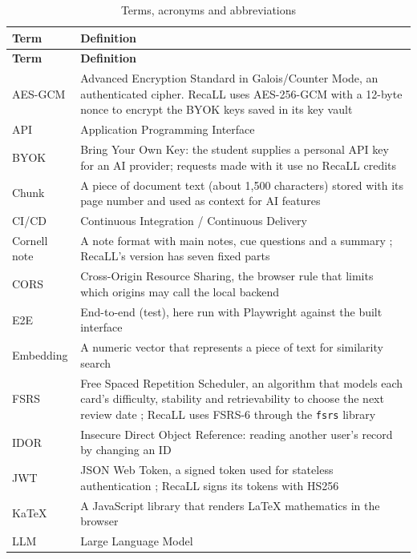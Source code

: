 \begin{small}
\begin{longtable}{@{}>{\raggedright\arraybackslash}p{3.0cm} >{\raggedright\arraybackslash}p{}@{}}
\caption{Terms, acronyms and abbreviations}\label{tab:terms}\\
\toprule
\textbf{Term} & \textbf{Definition}\\
\midrule
\endfirsthead
\toprule
\textbf{Term} & \textbf{Definition}\\
\midrule
\endhead
\bottomrule
\endfoot
AES-GCM & Advanced Encryption Standard in Galois/Counter Mode, an authenticated cipher. RecaLL
uses AES-256-GCM with a 12-byte nonce to encrypt the BYOK keys saved in its key vault \cite{nist80038d}\\
API & Application Programming Interface\\
BYOK & Bring Your Own Key: the student supplies a personal API key for an AI provider;
requests made with it use no RecaLL credits\\
Chunk & A piece of document text (about 1{,}500 characters) stored with its page number and
used as context for AI features\\
CI/CD & Continuous Integration / Continuous Delivery\\
Cornell note & A note format with main notes, cue questions and a summary \cite{pauk2011};
RecaLL's version has seven fixed parts\\
CORS & Cross-Origin Resource Sharing, the browser rule that limits which origins may call
the local backend\\
E2E & End-to-end (test), here run with Playwright against the built interface\\
Embedding & A numeric vector that represents a piece of text for similarity search\\
FSRS & Free Spaced Repetition Scheduler, an algorithm that models each card's difficulty,
stability and retrievability to choose the next review date \cite{ye2022fsrs}; RecaLL uses
FSRS-6 through the \texttt{fsrs} library\\
IDOR & Insecure Direct Object Reference: reading another user's record by changing an ID\\
JWT & JSON Web Token, a signed token used for stateless authentication \cite{rfc7519};
RecaLL signs its tokens with HS256\\
KaTeX & A JavaScript library that renders LaTeX mathematics in the browser\\
LLM & Large Language Model\\

\end{longtable}
\end{small}
